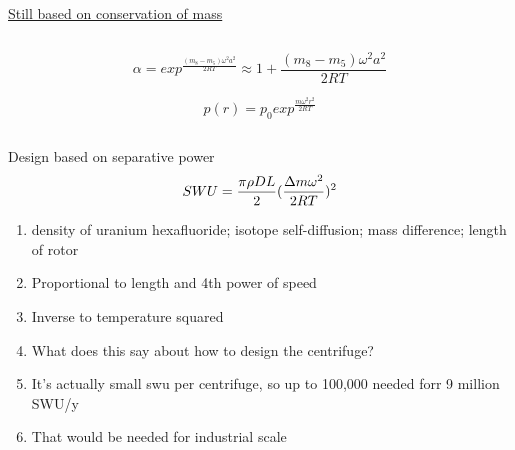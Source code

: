 \documentclass[aspectratio=1610,pdftex,dvipsnames,compress,xcolor={dvipsnames}]{beamer}
\newcommand{\acs}{\acrshort} %
\begin{document}
\begin{frame}{\href{https://uidaho.pressbooks.pub/nuclearengineering/chapter/front-end-of-the-fuel-cycle/}{Still based on conservation of mass}}
\begin{columns}[t]
\begin{column}{0.65\textwidth}
            \vspace*{\fill}

            \begin{equation}
                \alpha = exp^{\frac{(m_8-m_5) \omega^2 a^2}{2RT}} \approx 1 + \frac{(m_8-m_5) \omega^2 a^2}{2RT}
            \end{equation}
            
            \begin{equation}
                p(r) = p_0 exp^{\frac{m \omega^2 r^2}{2RT}}
            \end{equation}
        \end{column}

    \end{columns}
\end{frame}


\begin{frame}{Design based on separative power}
    \begin{equation}
        \LARGE
        SWU = \frac{\pi \rho DL}{2}(\frac{\Delta m \omega^2}{2RT})^2
    \end{equation}
    
    \vspace*{\fill}

    \begin{enumerate}[topsep=0pt,itemsep=21pt,leftmargin=*,label=(\arabic*)]
        \item[]density of uranium hexafluoride; isotope self-diffusion; mass difference; length of rotor
        \item[]Proportional to length and 4th power of speed
        \item[]Inverse to temperature squared
        \item[]What does this say about how to design the centrifuge?
        \item[]It's actually small \acs{swu} per centrifuge, so up to 100,000 needed forr 9 million SWU/y
        \item[]That would be needed for industrial scale
    \end{enumerate}
\end{frame}
\end{document}
